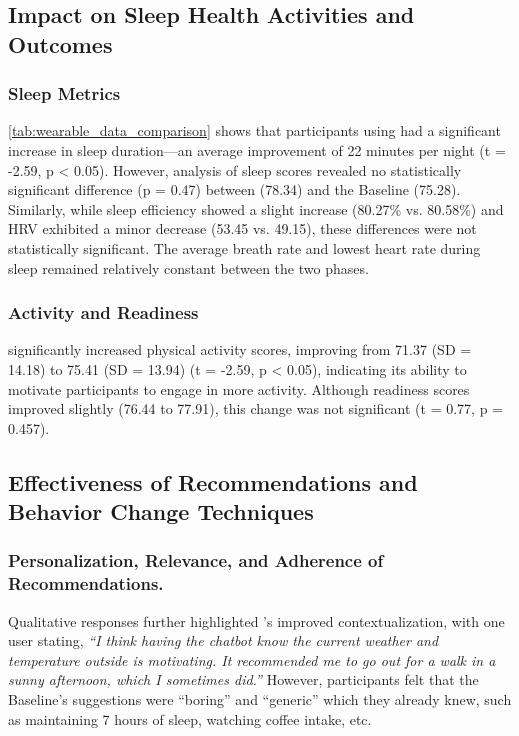 \subsection{Impact on Sleep Health Activities and Outcomes}

\subsubsection{Sleep Metrics}
\autoref{tab:wearable_data_comparison} shows that participants using \name{} had a significant increase in sleep duration—an average improvement of 22 minutes per night (t = -2.59, p < 0.05).
However, analysis of sleep scores revealed no statistically significant difference (p = 0.47) between \name{} (78.34) and the Baseline (75.28).
Similarly, while sleep efficiency showed a slight increase (80.27\% vs. 80.58\%) and HRV exhibited a minor decrease (53.45 vs. 49.15), these differences were not statistically significant. 
The average breath rate and lowest heart rate during sleep remained relatively constant between the two phases.

\subsubsection{Activity and Readiness}
\name{} significantly increased physical activity scores, improving from 71.37 (SD = 14.18) to 75.41 (SD = 13.94) (t = -2.59, p < 0.05), indicating its ability to motivate participants to engage in more activity. 
Although readiness scores improved slightly (76.44 to 77.91), this change was not significant (t = 0.77, p = 0.457).


\subsection{Effectiveness of Recommendations and Behavior Change Techniques}

\subsubsection{Personalization, Relevance, and Adherence of Recommendations.}
Qualitative responses further highlighted \name{}'s improved contextualization, with one user stating, \textit{``I think having the chatbot know the current weather and temperature outside is motivating. It recommended me to go out for a walk in a sunny afternoon, which I sometimes did.''} However, participants felt that the Baseline's suggestions were ``boring'' and ``generic'' which they already knew, such as maintaining 7 hours of sleep, watching coffee intake, etc.

